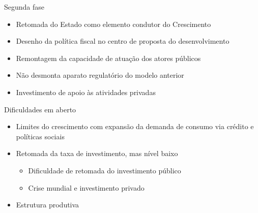\documentclass[presentation]{beamer}
\begin{document}
\begin{frame}[label={sec:orgb4d7933}]{Segunda fase}
\begin{itemize}
\item Retomada do Estado como elemento condutor do Crescimento
\item Desenho da política fiscal no centro de proposta do desenvolvimento
\item Remontagem da capacidade de atuação dos atores públicos
\item Não desmonta aparato regulatório do modelo anterior
\item Investimento de apoio às atividades privadas
\end{itemize}
\end{frame}


\begin{frame}[label={sec:org6d4ec0d}]{Dificuldades em aberto \cite{melloIndustrialismoAusteridadePolitica}}
\begin{itemize}
\item Limites do crescimento com expansão da demanda de consumo via crédito e políticas sociais
\item Retomada da taxa de investimento, mas nível baixo
\begin{itemize}
\item Dificuldade de retomada do investimento público
\item Crise mundial e investimento privado
\end{itemize}
\item Estrutura produtiva
\end{itemize}
\end{frame}
\end{document}
